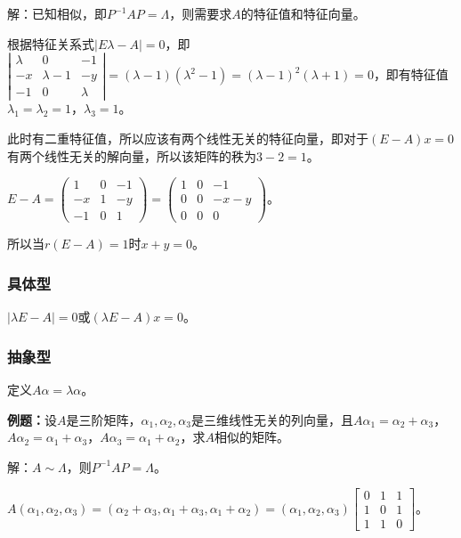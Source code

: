 解：已知相似，即$P^{-1}AP=\Lambda$，则需要求$A$的特征值和特征向量。

根据特征关系式$\vert E\lambda-A\vert=0$，即$\left\vert\begin{array}{ccc}
    \lambda & 0 & -1 \\
    -x & \lambda-1 & -y \\
    -1 & 0 & \lambda
\end{array}\right\vert=(\lambda-1)(\lambda^2-1)=(\lambda-1)^2(\lambda+1)=0$，即有特征值$\lambda_1=\lambda_2=1$，$\lambda_3=1$。

此时有二重特征值，所以应该有两个线性无关的特征向量，即对于$(E-A)x=0$有两个线性无关的解向量，所以该矩阵的秩为$3-2=1$。

$E-A=\left(\begin{array}{ccc}
    1 & 0 & -1 \\
    -x & 1 & -y \\
    -1 & 0 & 1
\end{array}\right)=\left(\begin{array}{ccc}
    1 & 0 & -1 \\
    0 & 0 & -x-y \\
    0 & 0 & 0
\end{array}\right)$。

所以当$r(E-A)=1$时$x+y=0$。

\paragraph{}

\subsubsection{具体型}

$\vert \lambda E-A\vert=0$或$(\lambda E-A)x=0$。

\subsubsection{抽象型}

定义$A\alpha=\lambda\alpha$。

\textbf{例题：}设$A$是三阶矩阵，$\alpha_1,\alpha_2,\alpha_3$是三维线性无关的列向量，且$A\alpha_1=\alpha_2+\alpha_3$，$A\alpha_2=\alpha_1+\alpha_3$，$A\alpha_3=\alpha_1+\alpha_2$，求$A$相似的矩阵。

解：$A\sim\Lambda$，则$P^{-1}AP=\Lambda$。

$A(\alpha_1,\alpha_2,\alpha_3)=(\alpha_2+\alpha_3,\alpha_1+\alpha_3,\alpha_1+\alpha_2)=(\alpha_1,\alpha_2,\alpha_3)\left[\begin{array}{ccc}
    0 & 1 & 1 \\
    1 & 0 & 1 \\
    1 & 1 & 0
\end{array}\right]$。

